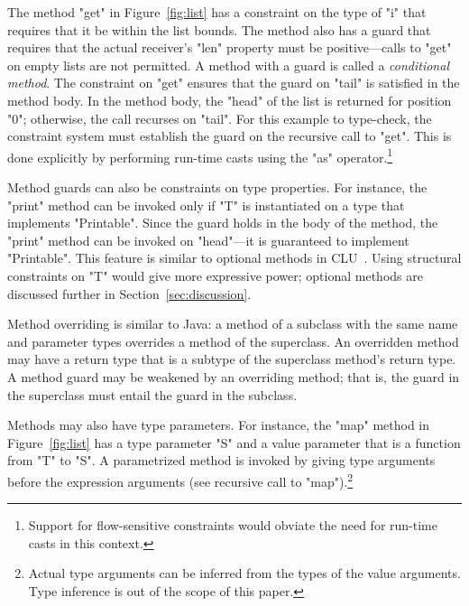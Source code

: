 The method \xcd"get" in Figure~\ref{fig:list}
has a constraint on the type of \xcd"i" that requires
that it be within the list bounds.
The method also has a guard that
requires that the actual
receiver's
\xcd"len" property must be positive---calls to \xcd"get" on empty
lists are not permitted.
A method with a guard is called a \emph{conditional method}.
The constraint on \xcd"get" ensures that the guard on 
\xcd"tail" is satisfied in the method body.
In the method body, the \xcd"head" of the list is returned for
position \xcd"0"; otherwise, the call recurses on \xcd"tail".
For this example to type-check, the constraint system
must establish
the guard on the recursive call to \xcd"get".
This is done explicitly by performing run-time casts using the
\xcd"as" operator.\footnote{Support for flow-sensitive constraints
would obviate the need for
run-time casts in this context.}

Method guards can also be constraints on type properties.
For instance, the \xcd"print" method can be invoked only if
\xcd"T" is instantiated on a type that implements
\xcd"Printable".  Since the guard holds in the body of the
method, the \xcd"print" method can be invoked on \xcd"head"---it
is guaranteed to implement \xcd"Printable".
This feature is similar to optional methods in CLU~\cite{clu}.
Using structural constraints on \xcd"T" would give more
expressive power; optional methods are discussed further in
Section~\ref{sec:discussion}.

Method overriding is similar to Java: a method of a subclass
with the same name and parameter types overrides a method of the
superclass.  An overridden method may have a return type that is
a subtype of the superclass method's return type.
A method guard may be weakened by an overriding
method; that is, the guard in the superclass must entail the  
guard in the subclass.

Methods may also have type parameters.  
For instance, the \xcd"map" method in Figure~\ref{fig:list} 
has a type parameter \xcd"S" and a value parameter that is a
function from \xcd"T" to \xcd"S".
A parametrized method is invoked by giving type arguments before the
expression arguments (see recursive call to
\xcd"map").\footnote{Actual type arguments can be inferred from the types
of the value arguments. Type inference is out of the scope of this paper.}

